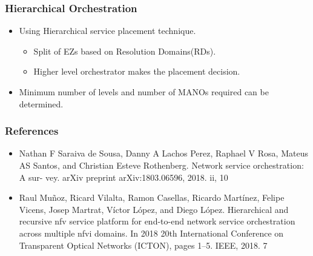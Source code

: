 \begin{frame}
\frametitle{Hierarchical Orchestration}
\begin{itemize}
 

\item Using Hierarchical service placement technique.
\
\begin{itemize}
	\item Split  of EZs based on Resolution Domains(RDs).
	\item Higher level orchestrator makes the placement decision.
\end{itemize}
\item Minimum number of levels and number of MANOs required can be determined.
\end{itemize}
\end{frame}

\begin{frame}
\frametitle{References}
\begin{itemize}
	\item Nathan F Saraiva de Sousa, Danny A Lachos Perez, Raphael V Rosa, Mateus AS
	Santos, and Christian Esteve Rothenberg. Network service orchestration: A sur-
	vey. arXiv preprint arXiv:1803.06596, 2018. ii, 10
	
	\item Raul Muñoz, Ricard Vilalta, Ramon Casellas, Ricardo Martínez, Felipe Vicens,
	Josep Martrat, Víctor López, and Diego López. Hierarchical and recursive nfv
	service platform for end-to-end network service orchestration across multiple nfvi
	domains. In 2018 20th International Conference on Transparent Optical Networks
	(ICTON), pages 1–5. IEEE, 2018. 7
    
\end{itemize}
\end{frame}

